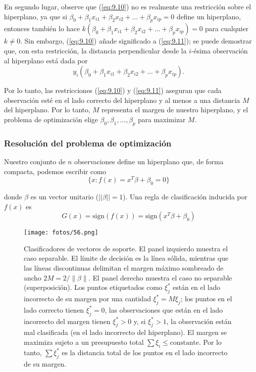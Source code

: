 En segundo lugar, observe que (\ref{eq:9.10}) no es realmente una restricción sobre el hiperplano, ya que si $\beta_0 + \beta_1 x_{i1} + \beta_2 x_{i2} + \ldots + \beta_p x_{ip} = 0$ define un hiperplano, entonces también lo hace $k (\beta_0 + \beta_1 x_{i1} + \beta_2 x_{i2} + \ldots + \beta_p x_{ip}) = 0$ para cualquier $k \neq 0$. Sin embargo, (\ref{eq:9.10}) añade significado a (\ref{eq:9.11}); se puede demostrar que, con esta restricción, la distancia perpendicular desde la $i$-ésima observación al hiperplano está dada por
\begin{equation}
y_i (\beta_0 + \beta_1 x_{i1} + \beta_2 x_{i2} + \ldots + \beta_p x_{ip}).
\end{equation}

Por lo tanto, las restricciones (\ref{eq:9.10}) y (\ref{eq:9.11}) aseguran que cada observación esté en el lado correcto del hiperplano y al menos a una distancia $M$ del hiperplano. Por lo tanto, $M$ representa el margen de nuestro hiperplano, y el problema de optimización elige $\beta_0, \beta_1, \ldots, \beta_p$ para maximizar $M$. 

\subsubsection{Resolución del problema de optimización}

Nuestro conjunto de $n$ observaciones define un hiperplano que, de forma compacta, podemos escribir como 
\begin{equation}
\{x: f(x) = x^T \beta + \beta_0 = 0\}
\end{equation}

\noindent donde $\beta$ es un vector unitario ($||\beta|| = 1$). Una regla de clasificación inducida por $f(x)$ es 
\begin{equation}
G(x) = \text{sign}(f(x)) = \text{sign}(x^T \beta + \beta_0)
\end{equation}

\begin{figure}[h]
\centering
\texttt{[image: fotos/56.png]}
\caption{Clasificadores de vectores de soporte. El panel izquierdo muestra el caso separable. El límite de decisión es la línea sólida, mientras que las líneas discontinuas delimitan el margen máximo sombreado de ancho $2M = 2/\|\beta\|$. El panel derecho muestra el caso no separable (superposición). Los puntos etiquetados como $\xi^*_j$ están en el lado incorrecto de su margen por una cantidad $\xi^*_j = M \xi_j$; los puntos en el lado correcto tienen $\xi^*_j = 0$, las observaciones que están en el lado incorrecto del margen tienen $\xi_j^* > 0$ y, si $\xi_j^* > 1$, la observación están mal clasificada (en el lado incorrecto del hiperplano). El margen se maximiza sujeto a un presupuesto total $\sum \xi_i \leq \text{constante}$. Por lo tanto, $\sum \xi^*_j$ es la distancia total de los puntos en el lado incorrecto de su margen.}
\label{fig:12.1}
\end{figure}


